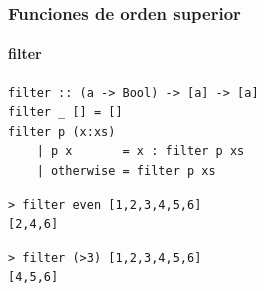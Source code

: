 \documentclass{beamer}
\begin{document}

\begin{frame}[fragile]
  \frametitle{Funciones de orden superior}
  \framesubtitle{filter}

\begin{lstlisting}
filter :: (a -> Bool) -> [a] -> [a]
filter _ [] = []
filter p (x:xs)
    | p x       = x : filter p xs
    | otherwise = filter p xs
\end{lstlisting}

\vspace{0.3cm}

\begin{lstlisting}[numbers=none, backgroundcolor=\color{lightgray}, keywordstyle=\color{black}]
> filter even [1,2,3,4,5,6]
[2,4,6]
\end{lstlisting}

\vspace{0.3cm}

\begin{lstlisting}[numbers=none, backgroundcolor=\color{lightgray}, keywordstyle=\color{black}]
> filter (>3) [1,2,3,4,5,6]
[4,5,6]
\end{lstlisting}

\end{frame}
\end{document}
